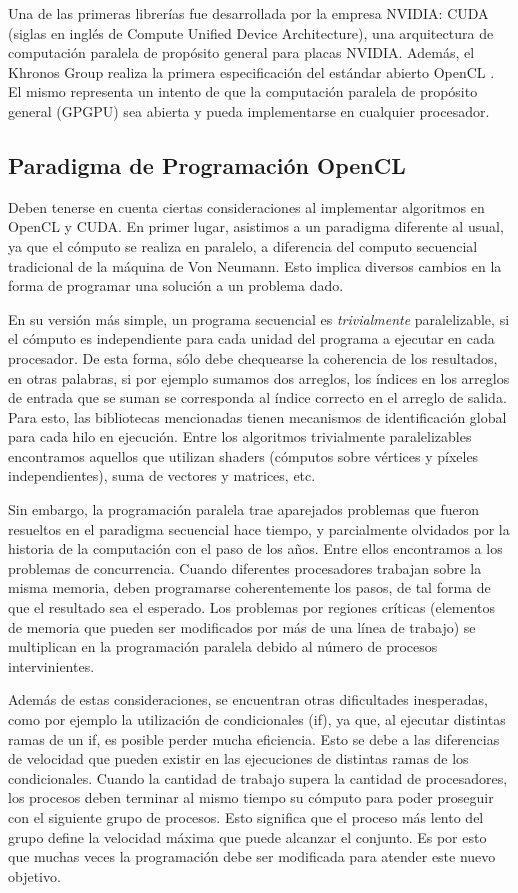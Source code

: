 Una de las primeras librerías fue desarrollada por la empresa NVIDIA: \acrshort{CUDA} (siglas en ingl\'es de Compute Unified Device Architecture), una arquitectura de computaci\'on paralela de prop\'osito general para placas NVIDIA.
Además, el Khronos Group realiza la primera especificación del estándar abierto OpenCL \cite{Stone2010}.
El mismo representa un intento de que la computación paralela de propósito general (GPGPU) sea abierta y pueda implementarse en cualquier procesador.

\subsection{Paradigma de Programación OpenCL}
Deben tenerse en cuenta ciertas consideraciones al implementar algoritmos en OpenCL y CUDA.
En primer lugar, asistimos a un paradigma diferente al usual, ya que el cómputo se realiza en paralelo, a diferencia del computo secuencial tradicional de la máquina de Von Neumann.
Esto implica diversos cambios en la forma de programar una solución a un problema dado.

En su versión más simple, un programa secuencial es {\em trivialmente} paralelizable, si el cómputo es independiente para cada unidad del programa a ejecutar en cada procesador.
De esta forma, sólo debe chequearse la coherencia de los resultados, en otras palabras, si por ejemplo sumamos dos arreglos, los índices en los arreglos de entrada que se suman se corresponda al índice correcto en el arreglo de salida.
Para esto, las bibliotecas mencionadas tienen mecanismos de identificación global para cada hilo en ejecución.
Entre los algoritmos trivialmente paralelizables encontramos aquellos que utilizan shaders (cómputos sobre vértices y píxeles independientes), suma de vectores y matrices, etc.

Sin embargo, la programación paralela trae aparejados problemas que fueron resueltos en el paradigma secuencial hace tiempo, y parcialmente olvidados por la historia de la computación con el paso de los años.
Entre ellos encontramos a los problemas de concurrencia.
Cuando diferentes procesadores trabajan sobre la misma memoria, deben programarse coherentemente los pasos, de tal forma de que el resultado sea el esperado.
Los problemas por regiones críticas (elementos de memoria que pueden ser modificados por más de una línea de trabajo) se multiplican en la programación paralela debido al número de procesos intervinientes.

Además de estas consideraciones, se encuentran otras dificultades inesperadas, como por ejemplo la utilización de condicionales (if), ya que, al ejecutar distintas ramas de un if, es posible perder mucha eficiencia.
Esto se debe a las diferencias de velocidad que pueden existir en las ejecuciones de distintas ramas de los condicionales.
Cuando la cantidad de trabajo supera la cantidad de procesadores, los procesos deben terminar al mismo tiempo su cómputo para poder proseguir con el siguiente grupo de procesos.
Esto significa que el proceso más lento del grupo define la velocidad máxima que puede alcanzar el conjunto.
Es por esto que muchas veces la programación debe ser modificada para atender este nuevo objetivo.


